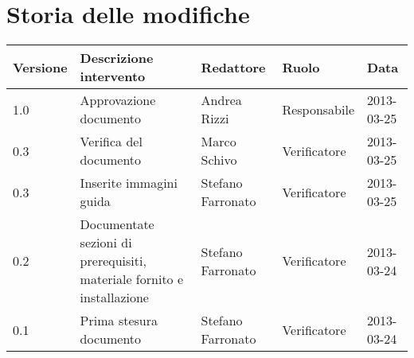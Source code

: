 \newcommand{\docName}{Manuale di installazione}
\newcommand{\docFileName}{manuale\_di\_installazione.2.0.pdf}
\newcommand{\docVers}{2.0}
\newcommand{\creationDate}{2013-03-24}
\newcommand{\modificationDate}{2013-03-25}
\newcommand{\docState}{Approvato}
\newcommand{\docUsage}{Esterno}
\newcommand{\docDistributionList}{Installatore del sistema}
\newcommand{\docAuthors}{Stefano Farronato}
\newcommand{\approvedBy}{Andrea Rizzi}
\newcommand{\verifiedBy}{Marco Schivo}
\newcommand{\docRoot}{..}
\def\INDICETABELLE{false}
\def\INDICEFIGURE{false}







\section*{Storia delle modifiche}

\begin{tabularx}{\textwidth}{lXlll}
\toprule
Versione & Descrizione intervento & Redattore & Ruolo & Data\\
\midrule %
1.0 & Approvazione documento& Andrea Rizzi & Responsabile & 2013-03-25\\
0.3 & Verifica del documento & Marco Schivo & Verificatore & 2013-03-25\\
0.3 & Inserite immagini guida& Stefano Farronato & Verificatore & 2013-03-25\\
0.2 & Documentate sezioni  di prerequisiti, materiale fornito e installazione& Stefano Farronato & Verificatore & 2013-03-24\\
0.1 & Prima stesura documento & Stefano Farronato & Verificatore & 2013-03-24\\
\bottomrule
\end{tabularx}
\newpage


